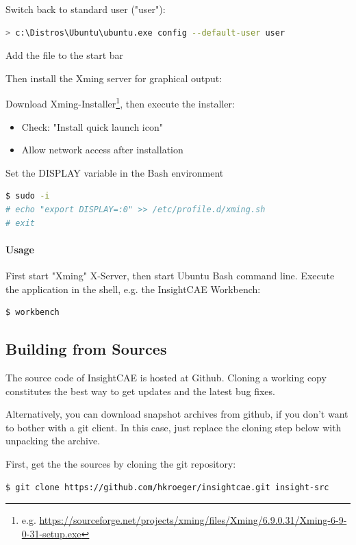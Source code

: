 Switch back to standard user ("user"):

\begin{lstlisting}[language=bash]
> c:\Distros\Ubuntu\ubuntu.exe config --default-user user
\end{lstlisting}

Add the file  to the start bar

Then install the Xming server for graphical output:

Download Xming-Installer\footnote{e.g. \url{https://sourceforge.net/projects/xming/files/Xming/6.9.0.31/Xming-6-9-0-31-setup.exe}}, then execute the installer:
\begin{itemize}
\item Check: "Install quick launch icon"
\item Allow network access after installation
\end{itemize}

Set the DISPLAY variable in the Bash environment
\begin{lstlisting}[language=bash]
$ sudo -i
# echo "export DISPLAY=:0" >> /etc/profile.d/xming.sh
# exit
\end{lstlisting}

\paragraph{Usage}
First start "Xming" X-Server,
then start Ubuntu Bash command line.
Execute the application in the shell, e.g. the InsightCAE Workbench:
\begin{lstlisting}[language=bash]
$ workbench
\end{lstlisting}

\subsection{Building from Sources}

The source code of InsightCAE is hosted at Github. 
Cloning a working copy constitutes the best way to get updates and the latest bug fixes.

Alternatively, you can download snapshot archives from github, if you don't want to bother with a git client.
In this case, just replace the cloning step below with unpacking the archive.

First, get the the sources by cloning the git repository:
\begin{lstlisting}[language=bash]
$ git clone https://github.com/hkroeger/insightcae.git insight-src
\end{lstlisting}

